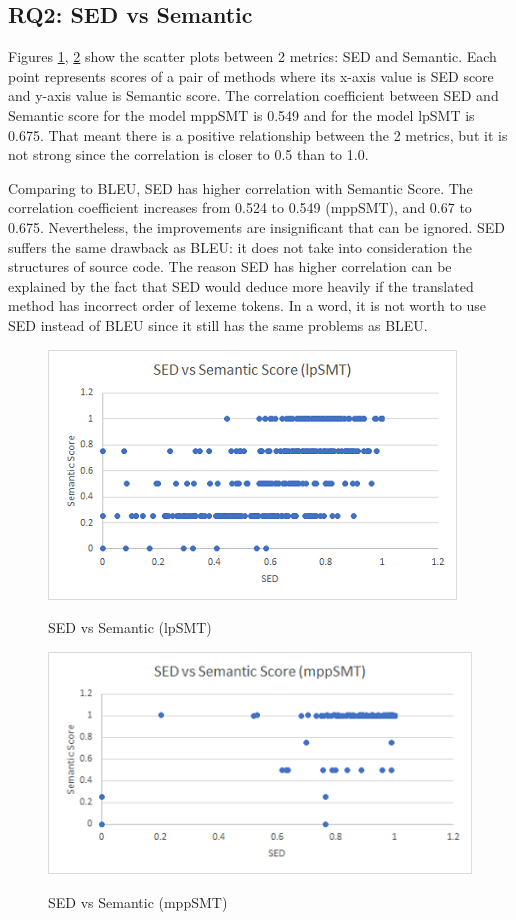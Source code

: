 \subsection{RQ2: SED vs Semantic}
Figures \ref{fig:SedSemlpSMT}, \ref{fig:SedSemMppSMT}  show the scatter plots between 2 metrics: SED and Semantic. Each point represents scores of a pair of methods where its x-axis value is SED score and y-axis value is Semantic score.
The correlation coefficient between SED and Semantic score for the model mppSMT is 0.549 and for the model lpSMT is 0.675. That meant there is a positive relationship between the 2 metrics, but it is not strong since the correlation is closer to 0.5 than to 1.0.

Comparing to BLEU, SED has higher correlation with Semantic Score. The correlation coefficient increases from 0.524 to 0.549 (mppSMT), and 0.67 to 0.675. Nevertheless, the improvements are insignificant that can be ignored. SED suffers the same drawback as BLEU: it does not take into consideration the structures of source code. The reason SED has higher correlation can be explained by the fact that SED would deduce more heavily if the translated method has incorrect order of lexeme tokens. In a word, it is not worth to use SED instead of BLEU since it still has the same problems as BLEU. 

\begin{figure}
\caption{SED vs Semantic (lpSMT)}
\centering
\includegraphics{img/sedvssem_lpSMT.png}
\label{fig:SedSemlpSMT}
\end{figure}

\begin{figure}
\caption{SED vs Semantic (mppSMT)}
\centering
\includegraphics{img/sedvssem_mppSMT.png}
\label{fig:SedSemMppSMT}
\end{figure}


